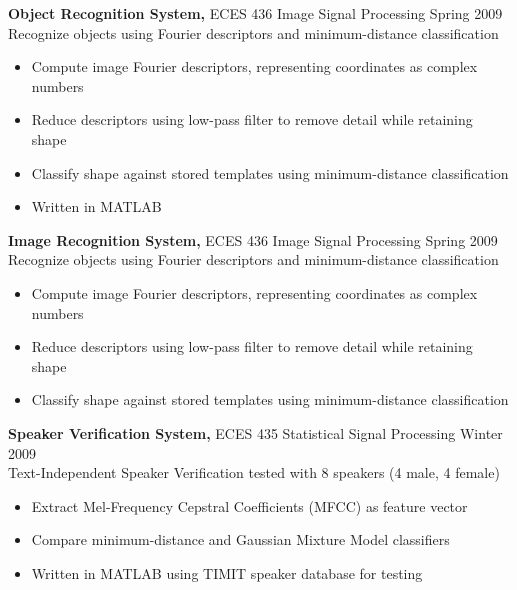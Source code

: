 \documentclass[margin]{res}
\begin{document}
\begin{resume}
\begin{telecom}
 {\bf Object Recognition System,} ECES 436 Image Signal Processing \hfill Spring 2009 \\
Recognize objects using Fourier descriptors and minimum-distance classification
 \begin{itemize} \itemsep -2pt  %
 \item Compute image Fourier descriptors, representing coordinates as complex numbers
 \item Reduce descriptors using low-pass filter to remove detail while retaining shape
 \item Classify shape against stored templates using minimum-distance classification
 \item Written in MATLAB
 \end{itemize}
\end{telecom}
\begin{general}
 {\bf Image Recognition System,} ECES 436 Image Signal Processing \hfill Spring 2009 \\
Recognize objects using Fourier descriptors and minimum-distance classification
 \begin{itemize} \itemsep -2pt  %
 \item Compute image Fourier descriptors, representing coordinates as complex numbers
 \item Reduce descriptors using low-pass filter to remove detail while retaining shape
 \item Classify shape against stored templates using minimum-distance classification
 \end{itemize}
\end{general}

\begin{telecom}
 {\bf Speaker Verification System,} ECES 435 Statistical Signal Processing \hfill Winter 2009 \\
Text-Independent Speaker Verification tested with 8 speakers (4 male, 4 female)
 \begin{itemize} \itemsep -2pt  %
 \item Extract Mel-Frequency Cepstral Coefficients (MFCC) as feature vector
 \item Compare minimum-distance and Gaussian Mixture Model classifiers
 \item Written in MATLAB using TIMIT speaker database for testing
 \end{itemize}
\end{telecom}


\end{resume}
\end{document}
